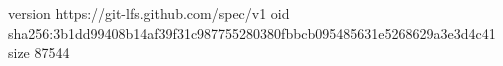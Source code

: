 version https://git-lfs.github.com/spec/v1
oid sha256:3b1dd99408b14af39f31c987755280380fbbcb095485631e5268629a3e3d4c41
size 87544
